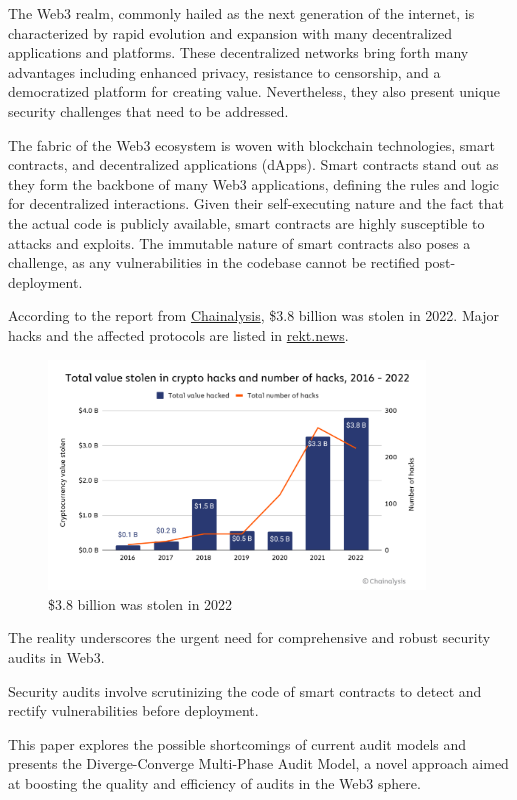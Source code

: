 \documentclass[10pt]{extarticle}
\begin{document}
The Web3 realm, commonly hailed as the next generation of the internet,
is characterized by rapid evolution and expansion with many
decentralized applications and platforms. These decentralized networks
bring forth many advantages including enhanced privacy, resistance to
censorship, and a democratized platform for creating value.
Nevertheless, they also present unique security challenges that need to
be addressed.

The fabric of the Web3 ecosystem is woven with blockchain technologies,
smart contracts, and decentralized applications (dApps). Smart contracts
stand out as they form the backbone of many Web3 applications, defining
the rules and logic for decentralized interactions. Given their
self-executing nature and the fact that the actual code is publicly
available, smart contracts are highly susceptible to attacks and
exploits. The immutable nature of smart contracts also poses a
challenge, as any vulnerabilities in the codebase cannot be rectified
post-deployment.

According to the report from
\href{https://www.chainalysis.com/blog/2022-biggest-year-ever-for-crypto-hacking/}{Chainalysis},
\$3.8 billion was stolen in 2022. Major hacks and the affected protocols
are listed in \href{https://rekt.news/leaderboard/}{rekt.news}.

\begin{figure}[htp]
  \centering
  \includegraphics[width=10cm]{img/chart-hack-totals.png}
  \caption{\$3.8 billion was stolen in 2022}
  \label{fig:galaxy}
\end{figure}

The reality underscores the urgent need for comprehensive and robust
security audits in Web3.

Security audits involve scrutinizing the code of smart contracts to
detect and rectify vulnerabilities before deployment.

This paper explores the possible shortcomings of current audit models
and presents the Diverge-Converge Multi-Phase Audit Model, a novel
approach aimed at boosting the quality and efficiency of audits in the
Web3 sphere.
\end{document}
